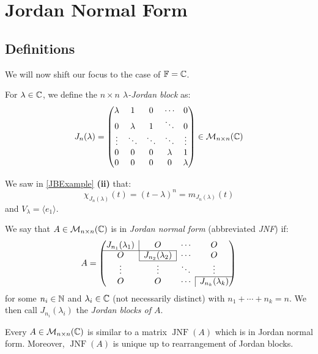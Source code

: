 \documentclass[../main.tex]{subfiles}
\begin{document}
\section{Jordan Normal Form}
\subsection{Definitions}
We will now shift our focus to the case of $\mathbb{F} = \mathbb{C}$.
\begin{definition}
  For $\lambda \in \mathbb{C}$, we define the \textit{$n \times n$ $\lambda$-Jordan block} as:
  \[
    J_n(\lambda) =
    \begin{pmatrix}
      \lambda & 1 & 0 & \cdots & 0 \\
      0 & \lambda & 1 & \ddots & 0 \\
      \vdots & \ddots & \ddots & \ddots & \vdots \\
      0 & 0 & 0 & \lambda & 1 \\
      0 & 0 & 0 & 0 & \lambda \\
    \end{pmatrix} \in \mathcal{M}_{n \times n}(\mathbb{C})
  \]
\end{definition}
We saw in \cref{JBExample} \textbf{(ii)} that:
\[
  \chi_{J_n(\lambda)}(t) = (t - \lambda)^{n} = m_{J_n(\lambda)}(t)
\]
and $V_{\lambda} = \langle e_1 \rangle$.
\begin{definition}
  We say that $A \in \mathcal{M}_{n \times n}(\mathbb{C})$ is in \textit{Jordan normal form} (abbreviated \textit{JNF}) if:
  \[
    A = \begin{pmatrix}
    \multicolumn{1}{c|}{J_{n_1}(\lambda_1)} & O & \cdots & O \\ \cline{1-2}
    O & \multicolumn{1}{|c|}{J_{n_2}(\lambda_2)} & \cdots & O \\ \cline{2-2}
    \vdots & \vdots & \ddots & \vdots \\ \cline{4-4}
    O & O & \cdots & \multicolumn{1}{|c}{J_{n_k}(\lambda_k)} \\
    \end{pmatrix}
  \]
  for some $n_i \in \mathbb{N}$ and $\lambda_i \in \mathbb{C}$ (not necessarily distinct) with $n_1 + \cdots + n_k = n$.
  We then call $J_{n_i}(\lambda_i)$ the \textit{Jordan blocks of $A$}.
\end{definition}
\begin{theorem}
  Every $A \in \mathcal{M}_{n \times n}(\mathbb{C})$ is similar to a matrix $\operatorname{JNF}(A)$ which is in Jordan normal form.
  Moreover, $\operatorname{JNF}(A)$ is unique up to rearrangement of Jordan blocks. \label{JNFUnique}
\end{theorem}
\end{document}

